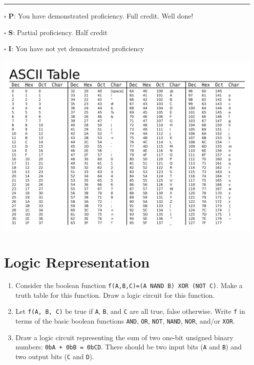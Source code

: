 \documentclass[12pt]{article}
\begin{document}
\vfill

\rule[1ex]{\textwidth}{.1pt}

$\square$ \textbf{P}: You have demonstrated proficiency. Full credit. Well done!

$\square$ \textbf{S}: Partial proficiency. Half credit

$\square$ \textbf{I}: You have not yet demonstrated proficiency

\newpage

\includegraphics[width=\textwidth]{wikimedia-ascii-table.png}

\newpage



\section*{Logic Representation}

\begin{enumerate}
\item Consider the boolean function \texttt{f(A,B,C)=(A NAND B) XOR (NOT C)}. Make a truth table for this function. Draw a logic circuit for this function.

\vfill

\item Let \texttt{f(A, B, C)} be true if \texttt{A}, \texttt{B}, and \texttt{C} are all true, false otherwise. Write \texttt{f} in terms of the basic boolean functions \texttt{AND}, \texttt{OR}, \texttt{NOT}, \texttt{NAND}, \texttt{NOR}, and/or \texttt{XOR}. 
\vfill

\item Draw a logic circuit representing the sum of two one-bit unsigned binary numbers: \texttt{0bA + 0bB = 0bCD}. There should be two input bits (\texttt{A} and \texttt{B}) and two output bits (\texttt{C} and \texttt{D}). 
\vfill
\end{enumerate}
\end{document}
